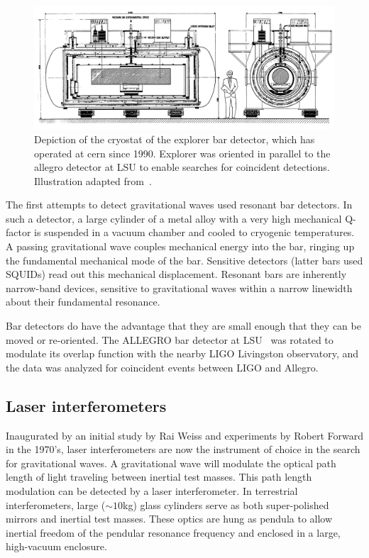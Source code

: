 \begin{figure}
\includegraphics[width=\columnwidth]{chapter1/figures/explorer.png}
\caption[EXPLORER bar detector]{\label{fig:explorer-bar}Depiction of
  the cryostat of the {\sc explorer} bar detector, which has operated
  at {\sc cern} since 1990.  {\sc Explorer} was oriented in parallel
  to the {\sc allegro} detector at LSU\cite{Mauceli1996Allegro} to
  enable searches for coincident detections.  Illustration adapted
  from~\cite{Astone1993Longterm}.}
\end{figure}

The first attempts to detect gravitational waves used resonant bar
detectors\cite{Thorne1980Gravitationalwave,Levine2004Early}.  
In such a detector, a large cylinder of a metal alloy with
a very high mechanical Q-factor is suspended in a vacuum chamber and
cooled to cryogenic temperatures.  A passing gravitational wave
couples mechanical energy into the bar, ringing up the fundamental
mechanical mode of the bar.  Sensitive detectors (latter bars used
SQUIDs) read out this mechanical displacement.  Resonant bars are
inherently narrow-band devices, sensitive to gravitational waves
within a narrow linewidth about their fundamental resonance.

Bar detectors do have the advantage that they are small enough that
they can be moved or re-oriented.  The ALLEGRO bar detector at LSU~\cite{Mauceli1996Allegro} was
rotated to modulate its overlap function with the nearby LIGO
Livingston observatory, and the data was analyzed for coincident
events between LIGO and Allegro\cite{Abbott2007First}.

\subsection{Laser interferometers}

Inaugurated by an initial study by Rai
Weiss\cite{Weiss1972Electromagnetically} and experiments by Robert
Forward\cite{Forward1978Wideband} in the 1970's, 
laser interferometers are now the instrument of choice in the search
for gravitational waves.  A gravitational wave will modulate the
optical path length of light traveling between inertial test masses.
This path length modulation can be detected by a laser interferometer.
%
In terrestrial interferometers, large ($\sim10$kg) glass cylinders
serve as both super-polished mirrors and inertial test masses.  These
optics are hung as pendula to allow inertial freedom of the pendular
resonance frequency and enclosed in a large, high-vacuum enclosure.

